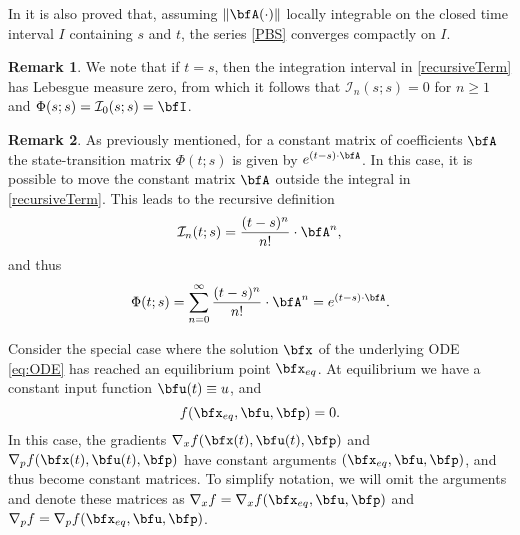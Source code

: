 \documentclass[DIV=12]{scrartcl} %
\theoremstyle{definition}
\newtheorem{remark}{Remark}
\begin{document}
In \cite{PeanoBaker} it is also proved that, assuming $\|\bfA(\cdot)\|$ locally integrable on the closed time interval $I$ containing $s$ and $t$, the series \eqref{PBS} converges compactly on $I$.

\begin{remark}
\label{remarkI_id}
We note that if $t=s$, then the integration interval in \eqref{recursiveTerm} has Lebesgue measure zero, from which it follows that $\mathcal{I}_{n}(s;s)=0$ for $n \ge 1$ and $\Phi(s;s)=\mathcal{I}_{0}(s;s)=\bfI$.
\end{remark}

\begin{remark}
As previously mentioned, for a constant matrix of coefficients $\bfA$ the state-transition matrix $\Phi(t;s)$ is given by $e^{(t-s)\cdot \bfA}$. In this case, it is possible to move the constant matrix $\bfA$ outside the integral in \eqref{recursiveTerm}. This leads to the recursive definition
\[
\mathcal{I}_n(t;s)=\frac{(t-s)^n}{n!}\cdot \bfA^{n},
\]
and thus
\[
\Phi(t;s)=\sum_{n=0}^{\infty}\frac{(t-s)^n}{n!}\cdot \bfA^{n} = e^{(t-s)\cdot \bfA} .
\]
\end{remark}

Consider the special case where the solution $\bfx$ of the underlying ODE \eqref{eq:ODE} has reached an equilibrium point $\bfx _{eq}$. At equilibrium we have a constant input function $\bfu(t)\equiv u$, and 
\[
    f(\bfx_{eq},\bfu,\bfp)=0.
\]
In this case, the gradients $\nabla_xf(\bfx(t),\bfu(t),\bfp)$ and $\nabla_p f(\bfx(t),\bfu(t),\bfp)$ have constant arguments $(\bfx_{eq},\bfu,\bfp)$, and thus become constant matrices. To simplify notation, we will omit the arguments and denote these matrices as $\nabla_xf=\nabla_xf(\bfx_{eq},\bfu,\bfp)$ and $\nabla_pf=\nabla_pf(\bfx_{eq},\bfu,\bfp)$.
\end{document}

